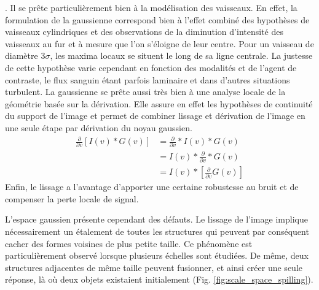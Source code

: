 . Il se prête particulièrement bien à la modélisation des vaisseaux. En effet, la formulation de la gaussienne correspond bien à l'effet combiné des hypothèses de vaisseaux cylindriques et des observations de la diminution d'intensité des vaisseaux au fur et à mesure que l'on s'éloigne de leur centre. Pour un vaisseau de diamètre $3\sigma$, les maxima locaux se situent le long de sa ligne centrale. La justesse de cette hypothèse varie cependant en fonction des modalités et de l'agent de contraste, le flux sanguin étant parfois laminaire et dans d'autres situations turbulent. La gaussienne se prête aussi très bien à une analyse locale de la géométrie basée sur la dérivation. Elle assure en effet les hypothèses de continuité du support de l'image et permet de combiner lissage et dérivation de l'image en une seule étape par dérivation du noyau gaussien. 
\begin{align}
  \frac{\partial}{\partial v} \left[ I(v) \ast G(v) \right] &= \frac{\partial}{\partial v} \ast I(v) \ast G(v) \\
                                                                &= I(v) \ast \frac{\partial}{\partial v} \ast G(v) \\
                                                                &= I(v) \ast \left[ \frac{\partial}{\partial v}G(v) \right]
\end{align}
Enfin, le lissage a l'avantage d'apporter une certaine robustesse au bruit et de compenser la perte locale de signal.

L'espace gaussien présente cependant des défauts. Le lissage de l'image implique nécessairement un étalement de toutes les structures qui peuvent par conséquent cacher des formes voisines de plus petite taille. Ce phénomène est particulièrement observé lorsque plusieurs échelles sont étudiées. De même, deux structures adjacentes de même taille peuvent fusionner, et ainsi créer une seule réponse, là où deux objets existaient initialement (Fig. \ref{fig:scale_space_spilling}).

